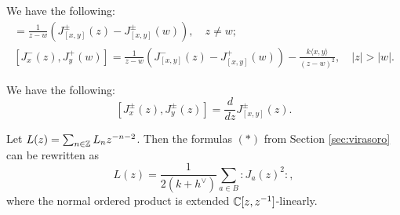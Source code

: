 \begin{theorem}
  We have the following:
  \begin{gather*}
    [J^{\pm}_x(z), J_y^{\pm}(w)]
    = \frac{1}{z - w} (J^{\pm}_{[x, y]}(z) - J^{\pm}_{[x, y]}(w)), \quad z \ne w; \\
    [J_x^-(z), J_y^+(w)]
    = \frac{1}{z - w} (J^-_{[x, y]}(z) - J^+_{[x, y]}(w))
    - \frac{k \langle x, y \rangle}{(z - w)^2},
    \quad |z| > |w|.
  \end{gather*}
\end{theorem}

\begin{corollary}
  We have the following:
  \[
    [J_x^{\pm}(z), J^{\pm}_y(z)]
    = \frac{d}{dz} J^{\pm}_{[x, y]}(z).
  \]
\end{corollary}

\begin{remark}
  Let $L(z) = \sum_{n \in \mathbb{Z}} L_n z^{-n - 2}$.
  Then the formulas $(*)$ from Section
  \ref{sec:virasoro} can be rewritten as
  \[
    L(z) = \frac{1}{2(k + h^\vee)} \sum_{a \in B}
    {:} J_a(z)^2 {:},
  \]
  where the normal ordered product is extended
  $\mathbb{C}[z, z^{-1}]$-linearly.
\end{remark}
